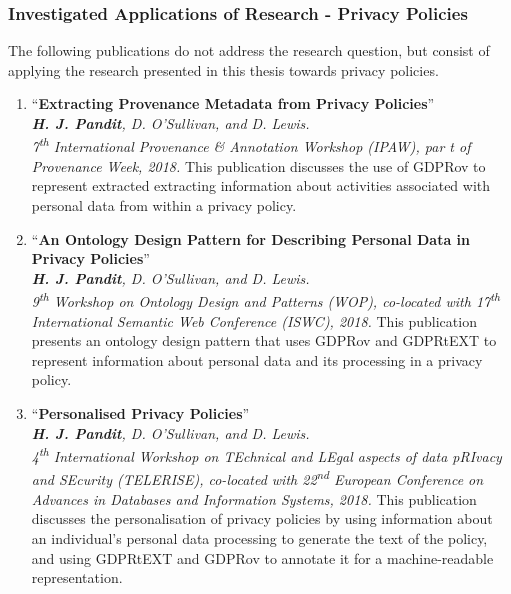 \subsubsection{Investigated Applications of Research - Privacy Policies}
The following publications do not address the research question, but consist of applying the research presented in this thesis towards privacy policies.
\begin{enumerate}[resume]
    \item ``\textbf{Extracting Provenance Metadata from Privacy Policies}'' \cite{pandit_extracting_2018} \\
    \textit{\textbf{H. J. Pandit}, D. O’Sullivan, and D. Lewis.} \\ 
    \textit{7\textsuperscript{th} International Provenance \& Annotation Workshop (IPAW), par t of Provenance Week, 2018.}
    \vspace{0.1cm} \newline This publication discusses the use of GDPRov to represent extracted extracting information about activities associated with personal data from within a privacy policy.
    \item ``\textbf{An Ontology Design Pattern for Describing Personal Data in Privacy Policies}'' \cite{pandit_ontology_2018} \\
    \textit{\textbf{H. J. Pandit}, D. O’Sullivan, and D. Lewis.} \\ 
    \textit{9\textsuperscript{th} Workshop on Ontology Design and Patterns (WOP), co-located with 17\textsuperscript{th} International Semantic Web Conference (ISWC), 2018.}
    \vspace{0.1cm} \newline This publication presents an ontology design pattern that uses GDPRov and GDPRtEXT to represent information about personal data and its processing in a privacy policy.
    \item ``\textbf{Personalised Privacy Policies}'' \cite{pandit_personalised_2018} \\
    \textit{\textbf{H. J. Pandit}, D. O’Sullivan, and D. Lewis.} \\ 
    \textit{4\textsuperscript{th} International Workshop on TEchnical and LEgal aspects of data pRIvacy and SEcurity (TELERISE), co-located with 22\textsuperscript{nd} European Conference on Advances in Databases and Information Systems, 2018.}
    \vspace{0.1cm} \newline This publication discusses the personalisation of privacy policies by using information about an individual's personal data processing to generate the text of the policy, and using GDPRtEXT and GDPRov to annotate it for a machine-readable representation.
\end{enumerate}

